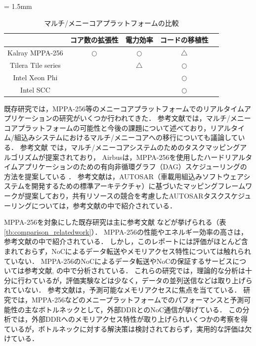 \documentclass[submit,techrep]{ipsj_v2/UTF8/ipsj}
\begin{document}
\begin{table}[t]
  \caption{\label{tb:comparison_manycore}
    マルチ/メニーコアプラットフォームの比較}
  \centering
  \scriptsize	                    %
  \tabcolsep = 1.5mm              %
  \begin{tabular}{c|cccc}
    \hline
    & コア数の拡張性 & 電力効率  & コードの移植性 & \\
    \hline
    \hline
    Kalray MPPA-256 \cite{de2014time} & \(\bigcirc\) & \(\bigcirc\) & \(\triangle\) & \\
    Tilera Tile series \cite{bell2008tile64} &  & \(\triangle\) & \(\bigcirc\) & \\
    Intel Xeon Phi \cite{chrysos2014intel} \cite{chrysos2012intel} &  &  & \(\bigcirc\) & \\
    Intel SCC \cite{baron2010single} &  &  & \(\bigcirc\) & \\
    \hline
  \end{tabular}
\end{table}

既存研究では，MPPA-256等のメニーコアプラットフォームでのリアルタイムアプリケーションの研究がいくつか行われてきた．
参考文献\cite{saidi2015shift}では，マルチ/メニーコアプラットフォームの可能性と今後の課題について述べており，リアルタイム/組込みシステムにおけるマルチ/メニーコアへの移行についても議論している．
参考文献\cite{carle2014static} \cite{faragardi2014communication} \cite{perret2016mapping}では，マルチ/メニーコアシステムのためのタスクマッピングアルゴリズムが提案されており，
Airbusは，MPPA-256を使用したハードリアルタイムアプリケーションのための有向非循環グラフ（DAG）スケジューリングの方法を提案している \cite{perret2016mapping}．
参考文献\cite{faragardi2014communication}は，AUTOSAR（車載用組込みソフトウェアシステムを開発するための標準アーキテクチャ\cite{furst2009autosar}）に基づいたマッピングフレームワークが提案しており，共有リソースの競合を考慮したAUTOSARタスクスケジューリングについては，参考文献\cite{becker2016contention}の中で紹介されている．

MPPA-256を対象にした既存研究は主に参考文献\cite{deDinechin2014GSN} \cite{denet2017work} \cite{kanter2015kalray} \cite{perret2016predictable} などが挙げられる（表\ref{tb:comparison_relatedwork}）．
MPPA-256の性能やエネルギー効率の高さは，参考文献\cite{kanter2015kalray}の中で紹介されている．
しかし，このレポートには評価がほとんど含まれておらず，NoCによるデータ転送やメモリアクセス特性については触れられていない．
MPPA-256のNoCによるデータ転送やNoCの保証するサービスについては参考文献\cite{deDinechin2014GSN}, \cite{denet2017work}の中で分析されている．
これらの研究では，理論的な分析は十分に行わているが，評価実験などは少なく，データの並列送信などは取り上げられていない．
参考文献\cite{perret2016predictable}は，予測可能なメモリアクセスに焦点を当てている．
研究では，MPPA-256などのメニープラットフォームでのパフォーマンスと予測可能性の主なボトルネックとして，外部DDRとのNoC通信が挙げている．
この分析では，外部DDRへのメモリアクセス特性が取り上げられいくつかの考察を得ているが，ボトルネックに対する解決策は検討されておらず，実用的な評価は欠けている．
\end{document}
